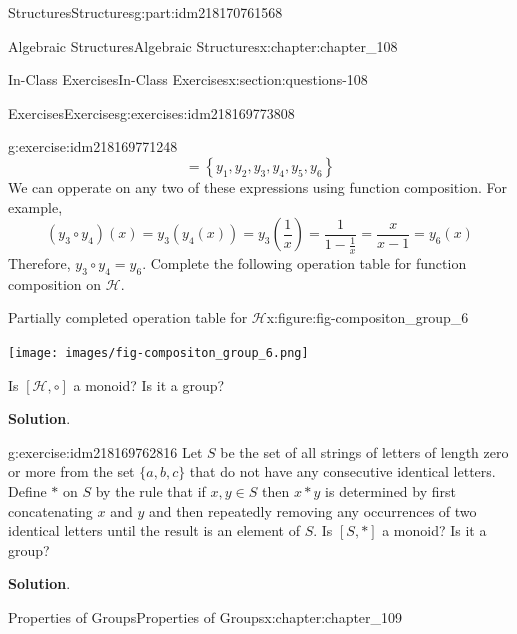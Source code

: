 \documentclass[oneside,10pt,]{book}
\newcommand{\blocktitlefont}{\relax}
\numberwithin{equation}{section}
\begin{document}
\begin{partptx}{Structures}{}{Structures}{}{}{g:part:idm218170761568}
\begin{chapterptx}{Algebraic Structures}{}{Algebraic Structures}{}{}{x:chapter:chapter_108}
\begin{sectionptx}{In-Class Exercises}{}{In-Class Exercises}{}{}{x:section:questions-108}
\begin{exercises-subsection-numberless}{Exercises}{}{Exercises}{}{}{g:exercises:idm218169773808}
\begin{exercisegroup}
\begin{divisionexerciseeg}{3}{}{}{g:exercise:idm218169771248}
\begin{equation*}
=\left\{y_1,y_2,y_3,y_4,y_5,y_6\right\}
\end{equation*}
We can opperate on any two of these expressions using function composition.  For example,%
\begin{equation*}
(y_3 \circ y_4)(x) = y_3(y_4(x))=y_3(\frac{1}{x})=\frac{1}{1-\frac{1}{x}}=\frac{x}{x-1}=y_6(x)
\end{equation*}
Therefore, \(y_3 \circ y_4 = y_6\).  Complete the following operation table for function composition on \(\mathcal{H}\).%
\begin{figureptx}{Partially completed operation table for \(\mathcal{H}\)}{x:figure:fig-compositon_group_6}{}%
\begin{image}{0.15}{0.7}{0.15}%
\texttt{[image: images/fig-compositon\_group\_6.png]}
\end{image}%
\tcblower
\end{figureptx}%
Is \([\mathcal{H},\circ]\) a monoid? Is it a group?%
\par\smallskip%
\noindent\textbf{\blocktitlefont Solution}.\hypertarget{g:solution:idm218169763168}{}\quad{}%
\end{divisionexerciseeg}%
\begin{divisionexerciseeg}{4}{}{}{g:exercise:idm218169762816}%
Let \(S\) be the set of all strings of letters of length zero or more from the set \(\{a,b,c\}\) that do not have any consecutive identical letters.  Define \(*\) on \(S\) by the rule that if \(x, y \in S\) then \(x*y\) is determined by first concatenating  \(x\) and \(y\) and then repeatedly removing any occurrences of two identical letters until the result is an element of \(S\).   Is \([S,*]\) a monoid?  Is it a group?%
\par\smallskip%
\noindent\textbf{\blocktitlefont Solution}.\hypertarget{g:solution:idm218169762432}{}\quad{}%
\end{divisionexerciseeg}%
\end{exercisegroup}
\par\medskip\noindent
\end{exercises-subsection-numberless}
\end{sectionptx}
\end{chapterptx}
%
\typeout{************************************************}
\typeout{************************************************}
%
\begin{chapterptx}{Properties of Groups}{}{Properties of Groups}{}{}{x:chapter:chapter_109}
%
%
%
\typeout{************************************************}

\end{chapterptx}
\end{partptx}
\end{document}
